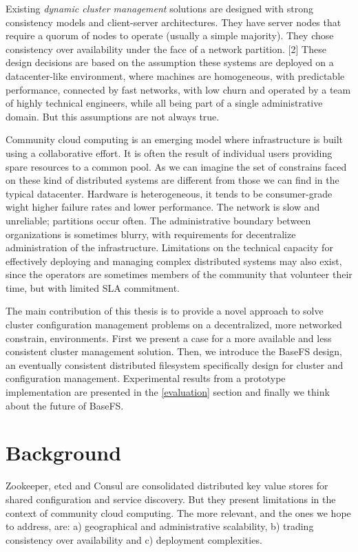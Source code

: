 \documentclass{sig-alternate}
\begin{document}
Existing \textit{dynamic cluster management} solutions are designed with strong consistency models and client-server architectures. They have server nodes that require a quorum of nodes to operate (usually a simple majority). They chose consistency over availability under the face of a network partition. [2] These design decisions are based on the assumption these systems are deployed on a datacenter-like environment, where machines are homogeneous, with predictable performance, connected by fast networks, with low churn and operated by a team of highly technical engineers, while all being part of a single administrative domain. But this assumptions are not always true.

Community cloud computing is an emerging model where infrastructure is built using a collaborative effort. It is often the result of individual users providing spare resources to a common pool. As we can imagine the set of constrains faced on these kind of distributed systems are different from those we can find in the typical datacenter. Hardware is heterogeneous, it tends to be consumer-grade wight higher failure rates and lower performance. The network is slow and unreliable; partitions occur often. The administrative boundary between organizations is sometimes blurry, with requirements for decentralize administration of the infrastructure. Limitations on the technical capacity for effectively deploying and managing complex distributed systems may also exist, since the operators are sometimes members of the community that volunteer their time, but with limited SLA commitment.

The main contribution of this thesis is to provide a novel approach to solve cluster configuration management problems on a decentralized, more networked constrain, environments. First we present a case for a more available and less consistent cluster management solution. Then, we introduce the BaseFS design, an eventually consistent distributed filesystem specifically design for cluster and configuration management. Experimental results from a prototype implementation are presented in the \ref{evaluation} section and finally we think about the future of BaseFS.

\section{Background}

Zookeeper, etcd and Consul are consolidated distributed key value stores for shared configuration and service discovery. But they present limitations in the context of community cloud computing. The more relevant, and the ones we hope to address, are: a) geographical and administrative scalability, b) trading consistency over availability and c) deployment complexities.
\end{document}
